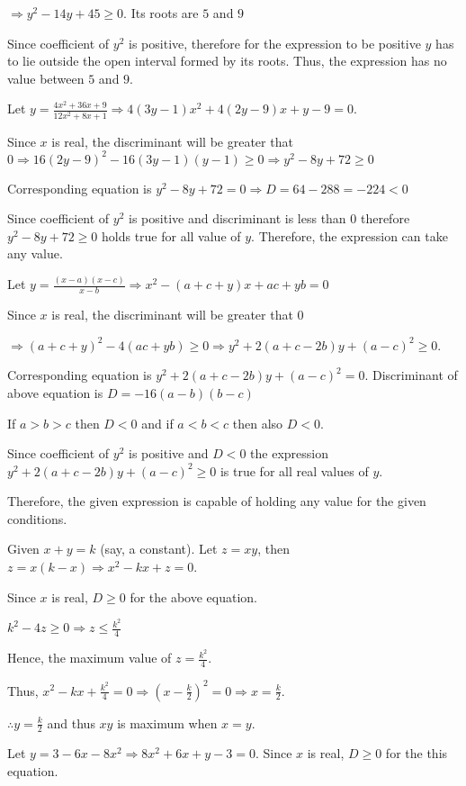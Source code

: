   $\Rightarrow y^2 - 14y + 45 \ge 0$. Its roots are $5$ and $9$

  Since coefficient of $y^2$ is positive, therefore for the expression to be positive $y$ has to lie outside
  the open interval formed by its roots. Thus, the expression has no value between $5$ and $9$.
\item Let $y = \frac{4x^2 + 36x + 9}{12x^2 + 8x + 1}\Rightarrow 4(3y - 1)x^2 + 4(2y - 9)x + y - 9 = 0$.

  Since $x$ is real, the discriminant will be greater that $0\Rightarrow 16(2y - 9)^2 - 16(3y - 1)(y - 1)
  \ge 0\Rightarrow y^2 - 8y + 72 \ge 0$

  Corresponding equation is $y^2 - 8y + 72 = 0\Rightarrow D = 64 - 288 = -224 < 0$

  Since coefficient of $y^2$ is positive and discriminant is less than $0$ therefore $y^2 - 8y + 72 \ge 0$
  holds true for all value of $y$. Therefore, the expression can take any value.
\item Let $y = \frac{(x - a)(x - c)}{x -b}\Rightarrow x^2 - (a + c + y)x + ac + yb = 0$

  Since $x$ is real, the discriminant will be greater that $0$

  $\Rightarrow (a + c + y)^2 - 4(ac + yb) \ge 0\Rightarrow y^2 + 2(a + c - 2b)y + (a - c)^2 \ge 0$.

  Corresponding equation is $y^2 + 2(a + c - 2b)y + (a - c)^2 = 0$. Discriminant of above equation is $D
  = -16(a - b)(b - c)$

  If $a > b > c$ then $D < 0$ and if $a < b < c$ then also $D < 0$.

  Since coefficient of $y^2$ is positive and $D < 0$ the expression $y^2 + 2(a + c - 2b)y + (a - c)^2 \ge 0$
  is true for all real values of $y$.

  Therefore, the given expression is capable of holding any value for the given conditions.
\item Given $x + y = k$ (say, a constant). Let $z = xy$, then $z = x(k - x) \Rightarrow x^2 - kx + z = 0$.

  Since $x$ is real, $D \ge 0$ for the above equation.

  $k^2 - 4z \ge 0 \Rightarrow z \le \frac{k^2}{4}$

  Hence, the maximum value of $z = \frac{k^2}{4}$.

  Thus, $x^2 - kx + \frac{k^2}{4} = 0 \Rightarrow \left(x - \frac{k}{2}\right)^2 = 0 \Rightarrow x = \frac{k}{2}$.

  $\therefore y = \frac{k}{2}$ and thus $xy$ is maximum when $x = y$.
\item Let $y = 3 - 6x - 8x^2 \Rightarrow 8x^2 + 6x + y - 3 = 0$. Since $x$ is real, $D \ge 0$ for the this equation.

